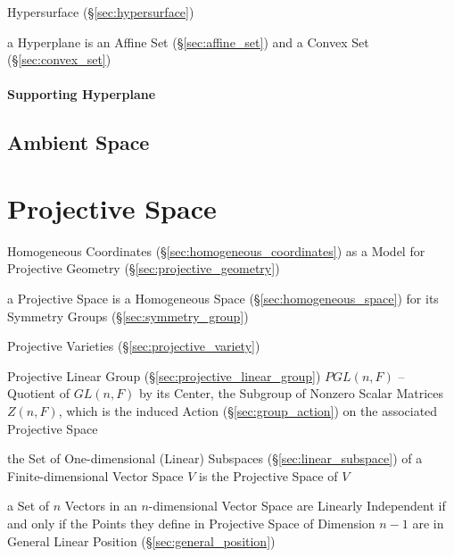\fist Hypersurface (\S\ref{sec:hypersurface})

a Hyperplane is an Affine Set (\S\ref{sec:affine_set}) and a Convex Set
(\S\ref{sec:convex_set})



\paragraph{Supporting Hyperplane}\label{sec:supporting_hyperplane}\hfill



\subsection{Ambient Space}\label{sec:ambient_space}




\section{Projective Space}\label{sec:projective_space}

Homogeneous Coordinates (\S\ref{sec:homogeneous_coordinates}) as a Model for
Projective Geometry (\S\ref{sec:projective_geometry})

a Projective Space is a Homogeneous Space (\S\ref{sec:homogeneous_space}) for
its Symmetry Groups (\S\ref{sec:symmetry_group}) %

\fist Projective Varieties (\S\ref{sec:projective_variety})

Projective Linear Group (\S\ref{sec:projective_linear_group}) $PGL(n,F)$ --
Quotient of $GL(n,F)$ by its Center, the Subgroup of Nonzero Scalar Matrices
$Z(n,F)$, which is the induced Action (\S\ref{sec:group_action}) on the
associated Projective Space

the Set of One-dimensional (Linear) Subspaces (\S\ref{sec:linear_subspace}) of a
Finite-dimensional Vector Space $V$ is the Projective Space of $V$

a Set of $n$ Vectors in an $n$-dimensional Vector Space are Linearly
Independent if and only if the Points they define in Projective Space of
Dimension $n-1$ are in General Linear Position (\S\ref{sec:general_position})

